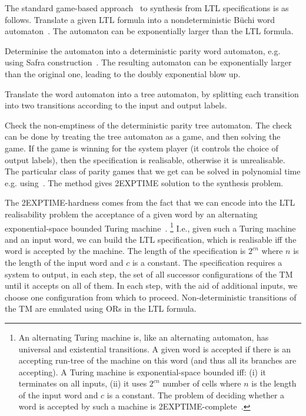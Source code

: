 The standard game-based approach~\cite{DBLP:conf/popl/PnueliR89} to synthesis from LTL specifications is as follows.
\li
\- Translate a given LTL formula into a nondeterministic B\"uchi word automaton~\cite{DBLP:journals/iandc/VardiW94}.
   The automaton can be exponentially larger than the LTL formula.

\- Determinise the automaton into a deterministic parity word automaton,
   e.g. using Safra construction~\cite{Safra}.
   The resulting automaton can be exponentially larger than the original one,
   leading to the doubly exponential blow up.

\- Translate the word automaton into a tree automaton,
   by splitting each transition into two transitions according to the input and output labels.

\- Check the non-emptiness of the deterministic parity tree automaton.
   The check can be done by treating the tree automaton as a game, and then solving the game.
   If the game is winning for the system player (it controls the choice of output labels),
   then the specification is realisable,
   otherwise it is unrealisable.
   The particular class of parity games that we get can be solved in polynomial time e.g. using~\cite{DBLP:conf/stoc/CaludeJKL017}.
\il
The method gives 2EXPTIME solution to the synthesis problem.

The 2EXPTIME-hardness comes from the fact that we can encode
into the LTL realisability problem
the acceptance of a given word by an alternating exponential-space bounded Turing machine~\cite{Pnueli1989,Vardi:1985:IUL:22145.22173}.%
\footnote{%
  An alternating Turing machine is, like an alternating automaton,
  has universal and existential transitions.
  A given word is accepted if there is an accepting run-tree of the machine on this word
  (and thus all its branches are accepting).
  A Turing machine is exponential-space bounded iff:
  (i) it terminates on all inputs,
 (ii) it uses $2^{cn}$ number of cells where $n$ is the length of the input word
      and $c$ is a constant.
 The problem of deciding whether a word is accepted by such a machine is 2EXPTIME-complete~\cite{Chandra:1981:ALT:322234.322243}.
}
I.e., given such a Turing machine and an input word,
we can build the LTL specification,
which is realisable
iff
the word is accepted by the machine.
The length of the specification is $2^{cn}$ where $n$ is the length of the input word and $c$ is a constant.
The specification requires a system to output,
in each step,
the set of all successor configurations of the TM until it accepts on all of them.
In each step, with the aid of additional inputs,
we choose one configuration from which to proceed.
Non-deterministic transitions of the TM are emulated using ORs in the LTL formula.


